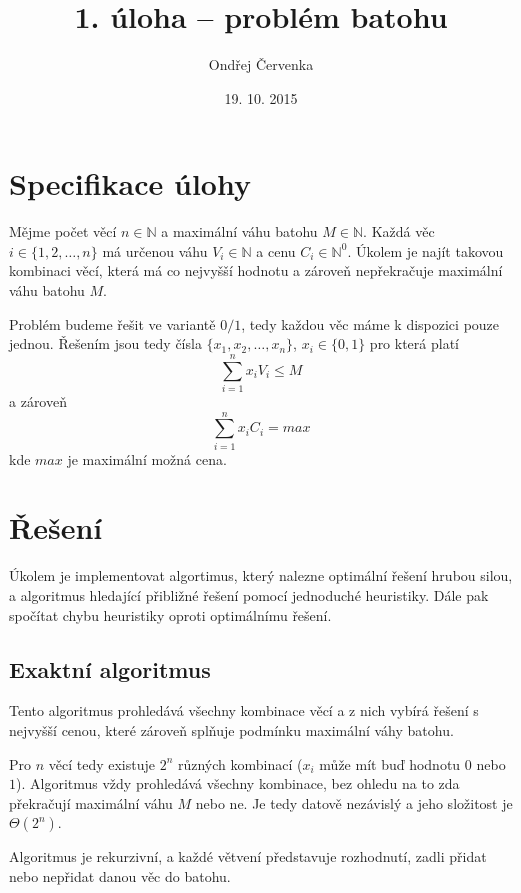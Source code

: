 \documentclass[11pt]{article}
\begin{document}
\title{1. úloha -- problém batohu}
\author{Ondřej Červenka}
\date{19. 10. 2015}
\maketitle

\section{Specifikace úlohy}

Mějme počet věcí $n \in \mathbb{N}$ a maximální váhu batohu $M \in \mathbb{N}$. \newline Každá věc $i \in \{1, 2, \ldots, n\}$ má určenou váhu $V_i \in \mathbb{N}$ a cenu $C_i \in \mathbb{N}^0$. Úkolem je najít takovou kombinaci věcí, která má co nejvyšší hodnotu a zároveň nepřekračuje maximální váhu batohu $M$.

Problém budeme řešit ve variantě $0/1$, tedy každou věc máme k dispozici pouze jednou. Řešením jsou tedy čísla $\{x_1, x_2, \ldots, x_n\}$, $x_i \in \{0,1\}$ pro která platí $$\sum_{i=1}^n x_iV_i \leq M$$ a zároveň $$\sum_{i=1}^n x_iC_i = max $$ kde $max$ je maximální možná cena.

\section{Řešení}

Úkolem je implementovat algortimus, který nalezne optimální řešení hrubou silou, a algoritmus hledající přibližné řešení pomocí jednoduché heuristiky. Dále pak spočítat chybu heuristiky oproti optimálnímu řešení.

\subsection{Exaktní algoritmus}

Tento algoritmus prohledává všechny kombinace věcí a z nich vybírá řešení s nejvyšší cenou, které zároveň splňuje podmínku maximální váhy batohu. 

Pro $n$ věcí tedy existuje $2^n$ různých kombinací ($x_i$ může mít buď hodnotu $0$ nebo $1$). Algoritmus vždy prohledává všechny kombinace, bez ohledu na to zda překračují maximální váhu $M$ nebo ne. Je tedy datově nezávislý a jeho složitost je $\Theta(2^n)$. 

Algoritmus je rekurzivní, a každé větvení představuje rozhodnutí, zadli přidat nebo nepřidat danou věc do batohu.
\end{document}
